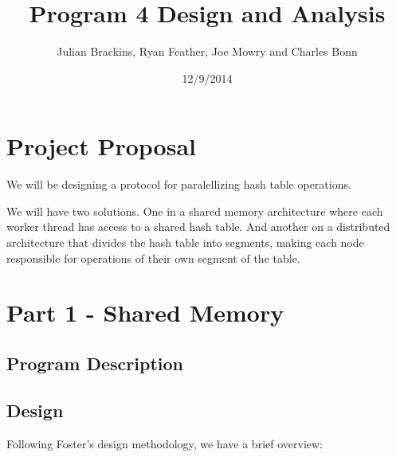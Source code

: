 \documentclass{article}
\begin{document}
\title{Program 4 Design and Analysis}
\author{Julian Brackins, Ryan Feather, Joe Mowry and Charles Bonn}
\date{12/9/2014}
\maketitle

\section{Project Proposal}

We will be designing a protocol for paralellizing hash table operations.

We will have two solutions. One in a shared memory architecture where each worker thread has access to a shared hash table. And another on a distributed architecture that divides the hash table into segments, making each node responsible for operations of their own segment of the table.

\section{Part 1 - Shared Memory}

\subsection{Program Description}

\subsection{Design}
Following Foster's design methodology, we have a brief overview:
\end{document}
